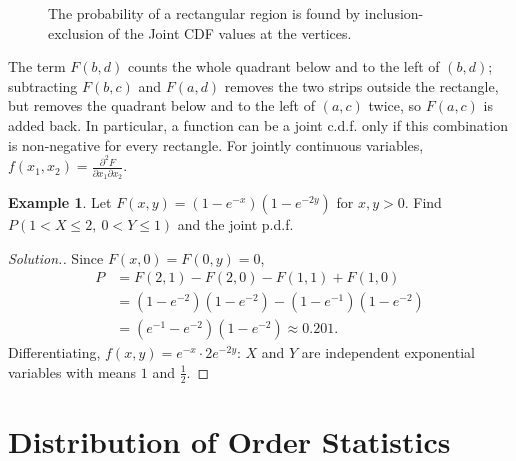 \documentclass[12pt,a4paper]{report}
\theoremstyle{definition}
\newtheorem{example}[thm]{Example}
\theoremstyle{plain}
\newenvironment{solution}
  {\renewcommand{\qedsymbol}{}\begin{proof}[\textit{Solution}.]}
  {\end{proof}}
\begin{document}
\begin{figure}[H]
\centering
{}
\caption{The probability of a rectangular region is found by inclusion-exclusion of the Joint CDF values at the vertices.}\end{figure}

The term $F(b,d)$ counts the whole quadrant below and to the left of $(b,d)$;
subtracting $F(b,c)$ and $F(a,d)$ removes the two strips outside the rectangle,
but removes the quadrant below and to the left of $(a,c)$ twice, so $F(a,c)$ is
added back. In particular, a function can be a joint c.d.f. only if this
combination is non-negative for every rectangle. For jointly continuous
variables, $f(x_1,x_2) = \frac{\partial^2F}{\partial x_1\partial x_2}$.

\begin{example}
\label{ex:bivariatecdf}
Let $F(x,y) = (1 - e^{-x})(1 - e^{-2y})$ for $x,y>0$. Find
$P(1<X\leq 2,\ 0<Y\leq 1)$ and the joint p.d.f.
\end{example}

\begin{solution}
Since $F(x,0) = F(0,y) = 0$,
\begin{align*}
P &= F(2,1) - F(2,0) - F(1,1) + F(1,0)\\
&= (1 - e^{-2})(1 - e^{-2}) - (1 - e^{-1})(1 - e^{-2})\\
&= (e^{-1} - e^{-2})(1 - e^{-2})\approx 0.201 .
\end{align*}
Differentiating, $f(x,y) = e^{-x}\cdot 2e^{-2y}$: $X$ and $Y$ are independent
exponential variables with means $1$ and $\frac12$.
\end{solution}

\section{Distribution of Order Statistics}
\end{document}
